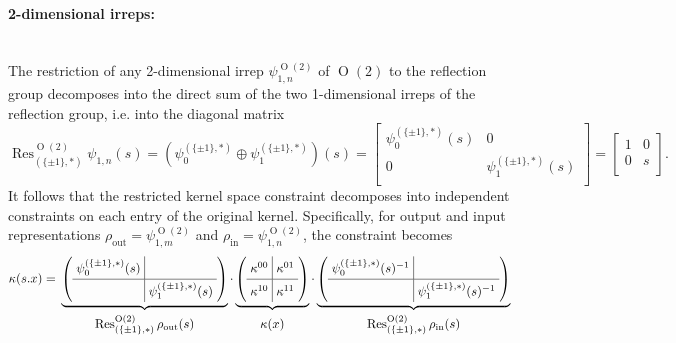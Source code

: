 \documentclass{article}
\renewcommand{\O}[1]{\ensuremath{\operatorname{O}(#1)}}
\newcommand{\Flip}{(\{\pm 1\}, *)}
\newcommand{\Res}[2]{\ensuremath{\operatorname{Res}_{#1}^{#2}}}
\newcommand{\XI}[1]{
	\begin{bmatrix}
		1 & \!\!\! 0 \\
		0 & \!\!\! #1 \\
	\end{bmatrix}
}
\begin{document}
\paragraph{2-dimensional irreps:}~\\[.75ex] 
The restriction of any 2-dimensional irrep $\psi^{\O2}_{1,n}$ of $\O2$ to the reflection group decomposes into the direct sum of the two 1-dimensional irreps of the reflection group, i.e. into the diagonal matrix
\[
	\Res{\Flip}{\O2}\psi_{1,n}(s) = \left(\psi_0^{\Flip} \oplus \psi_1^{\Flip}\right)\!(s) = 
	\begin{bmatrix}
		\psi_0^{\Flip}(s) & \!\!\! 0 \\
		0 & \!\!\!\psi_1^{\Flip}(s) \\
	\end{bmatrix} 
	= \XI{s}.
\]
It follows that the restricted kernel space constraint decomposes into independent constraints on each entry of the original kernel.
Specifically, for output and input representations $\rho_\text{out} = \psi_{1,m}^{\O2}$ and $\rho_\text{in} = \psi_{1,n}^{\O2}$, the constraint becomes
\[
	\kappa(s.x) = 
	\\
	\underbrace{
		\left(
		{\setlength\arraycolsep{3pt}
			\def\arraystretch{1.5}
			\begin{array}{c|c}
			\psi_0^{\Flip}(s) & \\ \hline
			& \psi_1^{\Flip}(s) \\
			\end{array}
		}
		\right)
	}_{
	\textstyle\begin{array}{c}
		\Res{\Flip}{\O2}\rho_\text{out}(s)
	\end{array}
	}
	\cdot
	\underbrace{
		\left(
		{\setlength\arraycolsep{3pt}
			\def\arraystretch{1.5}
			\begin{array}{c|c}
			\kappa^{00} & \kappa^{01}\\ \hline
			\kappa^{10} & \kappa^{11}\\
			\end{array}
		}
		\right)
	}_{
	\textstyle\begin{array}{c}
		\kappa(x)
	\end{array}
	}
	\cdot
	\underbrace{
		\left(
		{\setlength\arraycolsep{3pt}
			\def\arraystretch{1.5}
			\begin{array}{c|c}
			\psi_0^{\Flip}(s)^{-1} & \\ \hline
			& \psi_1^{\Flip}(s)^{-1} \\
			\end{array}
		}
		\right)
	}_{
	\textstyle\begin{array}{c}
		\Res{\Flip}{\O2}\rho_\text{in}(s)
	\end{array}
	}
\]
\end{document}
